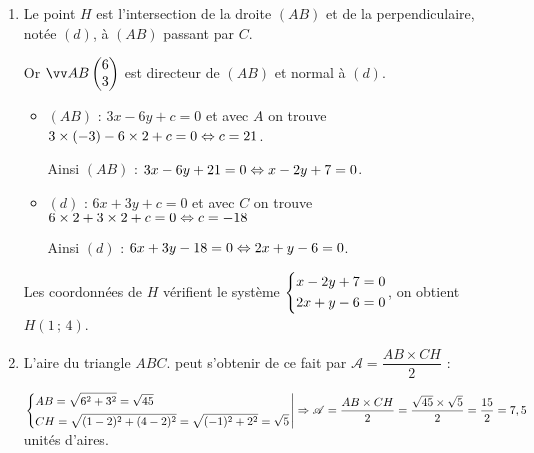 \documentclass[a4paper,11pt]{article}
\begin{document}
%

\begin{enumerate}
	\item Le point $H$ est l'intersection de la droite $(AB)$ et de la perpendiculaire, notée $(d)$, à $(AB)$ passant par $C$.
	
	Or $\vect{AB} \begin{pmatrix} 6\\3 \end{pmatrix}$ est directeur de $(AB)$ et normal à $(d)$.
	
	\begin{itemize}[leftmargin=*]
		\item $(AB)$ : $3x-6y+c=0$ et avec $A$ on trouve $3\times(-3)-6\times2+c=0 \Leftrightarrow c=21$.
		
		Ainsi $(AB)$ : $3x-6y+21=0 \Leftrightarrow x-2y+7=0$.
		\item $(d)$ : $6x+3y+c=0$ et avec $C$ on trouve $6\times2+3\times2+c=0 \Leftrightarrow c=-18$
		
		Ainsi $(d)$ : $6x+3y-18=0 \Leftrightarrow 2x+y-6=0$.
	\end{itemize}
	
	Les coordonnées de $H$ vérifient le système $\begin{dcases} x-2y+7=0 \\  2x+y-6=0 \end{dcases}$, on obtient $H(1\,;\,4)$.
	\item L'aire du triangle $ABC$. peut s'obtenir de ce fait par $\mathscr{A}=\dfrac{AB\times CH}{2}$ :
	
	$\left. \begin{dcases} AB=\sqrt{6^2+3^2}=\sqrt{45} \\ CH=\sqrt{(1-2)^2+(4-2)^2}=\sqrt{(-1)^2+2^2}=\sqrt{5} \end{dcases} \right| \Rightarrow \mathscr{A}=\dfrac{AB\times CH}{2}=\dfrac{\sqrt{45}\times\sqrt{5}}{2}=\dfrac{15}{2}=7,5$ unités d'aires.
\end{enumerate}
\end{document}
